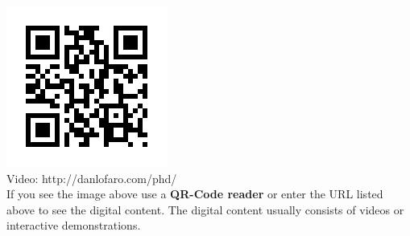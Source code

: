 \vfill
\addvspace{8cm}
  \centering
      \includegraphics{./qrcode/qrcode-phd.png}\\
      Video: http://danlofaro.com/phd/ \\
If you see the image above use a \textbf{QR-Code reader} or enter the URL listed above to see the digital content.  The digital content usually consists of videos or interactive demonstrations.

\vfill
